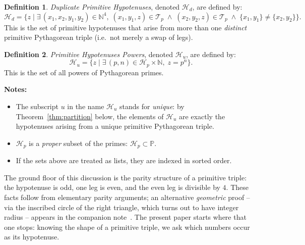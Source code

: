 \documentclass{article}
\theoremstyle{plain}
\theoremstyle{definition}
\newtheorem{defn}{Definition}
\theoremstyle{remark}
\begin{document}
\begin{defn}
{\em Duplicate Primitive Hypotenuses\/}, denoted $\mathcal{H}_d$, are defined by:
\begin{equation}
  \mathcal{H}_{d} = \{ z \; | \; \exists\, (x_1, x_2, y_1, y_2) \in \mathbb{N}^4, \;
      (x_1,y_1,z) \in \mathcal{T}_p \; \wedge \; (x_2, y_2, z) \in \mathcal{T}_p \; \wedge \; \{x_1, y_1\} \neq \{x_2, y_2\} \}.
\end{equation}
This is the set of primitive hypotenuses that arise from more than one
{\em distinct\/} primitive Pythagorean triple (i.e.\ not merely a swap of legs).
\end{defn}

\begin{defn}
{\em Primitive Hypotenuses Powers\/}, denoted $\mathcal{H}_u$, are defined by:
\begin{equation}
  \mathcal{H}_u = \{ z \; | \; \exists\,(p,n) \in \mathcal{H}_p \times \mathbb{N}, \; z = p^n \}.
\end{equation}
This is the set of all powers of Pythagorean primes.
\end{defn}


\textbf{Notes:}
\begin{itemize}
  \item The subscript $u$ in the name $\mathcal{H}_u$ stands for {\em unique\/}:
    by Theorem~\ref{thm:partition} below, the elements of $\mathcal{H}_u$ are
    exactly the hypotenuses arising from a unique primitive Pythagorean triple.
  \item $\mathcal{H}_p$ is a {\em proper\/} subset of the primes: $\mathcal{H}_p \subset \mathbb{P}$.
  \item If the sets above are treated as lists, they are indexed in sorted order.
\end{itemize}

The ground floor of this discussion is the parity structure of a primitive
triple: the hypotenuse is odd, one leg is even, and the even leg is
divisible by $4$. These facts follow from elementary parity arguments; an
alternative {\em geometric\/} proof -- via the inscribed circle of the right
triangle, which turns out to have integer radius -- appears in the companion
note~\cite{mcintire-prop}. The present paper starts where that one stops:
knowing the shape of a primitive triple, we ask which numbers occur as its
hypotenuse.
\end{document}
